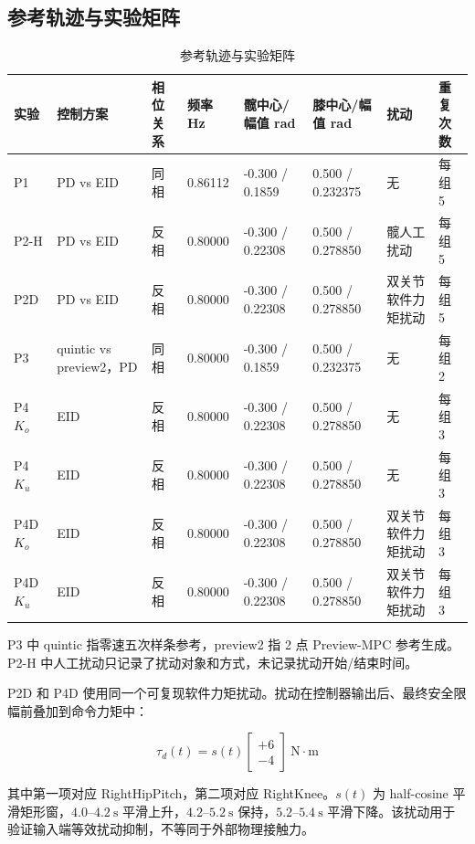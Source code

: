 \documentclass[12pt,a4paper]{ctexart}
\begin{document}
\subsection{参考轨迹与实验矩阵}


\begin{table}[htbp]
\centering
\footnotesize
\caption{参考轨迹与实验矩阵}
\begin{tabularx}{\textwidth}{YYYYYYYY}
\toprule
实验 & 控制方案 & 相位关系 & 频率 Hz & 髋中心/幅值 rad & 膝中心/幅值 rad & 扰动 & 重复次数 \\
\midrule
P1 & PD vs EID & 同相 & 0.86112 & -0.300 / 0.1859 & 0.500 / 0.232375 & 无 & 每组 5 \\
P2-H & PD vs EID & 反相 & 0.80000 & -0.300 / 0.22308 & 0.500 / 0.278850 & 髋人工扰动 & 每组 5 \\
P2D & PD vs EID & 反相 & 0.80000 & -0.300 / 0.22308 & 0.500 / 0.278850 & 双关节软件力矩扰动 & 每组 5 \\
P3 & quintic vs preview2，PD & 同相 & 0.80000 & -0.300 / 0.1859 & 0.500 / 0.232375 & 无 & 每组 2 \\
P4 $K_o$ & EID & 反相 & 0.80000 & -0.300 / 0.22308 & 0.500 / 0.278850 & 无 & 每组 3 \\
P4 $K_u$ & EID & 反相 & 0.80000 & -0.300 / 0.22308 & 0.500 / 0.278850 & 无 & 每组 3 \\
P4D $K_o$ & EID & 反相 & 0.80000 & -0.300 / 0.22308 & 0.500 / 0.278850 & 双关节软件力矩扰动 & 每组 3 \\
P4D $K_u$ & EID & 反相 & 0.80000 & -0.300 / 0.22308 & 0.500 / 0.278850 & 双关节软件力矩扰动 & 每组 3 \\
\bottomrule
\end{tabularx}
\end{table}


P3 中 quintic 指零速五次样条参考，preview2 指 2 点 Preview-MPC 参考生成。P2-H 中人工扰动只记录了扰动对象和方式，未记录扰动开始/结束时间。

P2D 和 P4D 使用同一个可复现软件力矩扰动。扰动在控制器输出后、最终安全限幅前叠加到命令力矩中：

\[
\tau_d(t)=s(t)
\begin{bmatrix}
+6\\
-4
\end{bmatrix}
\ \mathrm{N\cdot m}
\]

其中第一项对应 RightHipPitch，第二项对应 RightKnee。$s(t)$ 为 half-cosine 平滑矩形窗，$4.0$--$4.2\ \mathrm{s}$ 平滑上升，$4.2$--$5.2\ \mathrm{s}$ 保持，$5.2$--$5.4\ \mathrm{s}$ 平滑下降。该扰动用于验证输入端等效扰动抑制，不等同于外部物理接触力。
\end{document}
